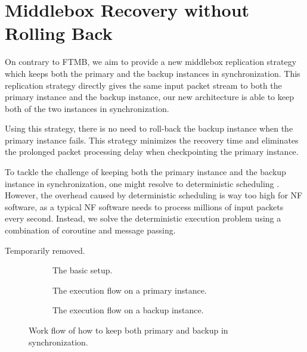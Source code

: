 \section{Middlebox Recovery without Rolling Back}

On contrary to FTMB, we aim to provide a new middlebox replication strategy
which keeps both the primary and the backup instances in synchronization. This
replication strategy directly gives the same input packet stream to both the
primary instance and the backup instance, our new architecture is able to keep
both of the two instances in synchronization.

Using this strategy, there is no need to roll-back the backup instance when the
primary instance fails. This strategy minimizes the recovery time and eliminates
the prolonged packet processing delay when checkpointing the primary instance.

To tackle the challenge of keeping both the primary instance and the backup
instance in synchronization, one might resolve to deterministic scheduling
\cite{}. However, the overhead caused by deterministic scheduling is way too
high for NF software, as a typical NF software needs to process millions of
input packets every second. Instead, we solve the deterministic execution
problem using a combination of coroutine and message passing.

\begin{verbbox} Temporarily removed. \end{verbbox}

\begin{figure}[!t]
  \begin{subfigure}[t]{0.5\linewidth}
    \centering
    \resizebox{0.95\columnwidth}{!}{\theverbbox}
    \caption{The basic setup.}\label{fig:overall}
  \end{subfigure}\hfill
  \begin{subfigure}[t]{0.5\linewidth}
    \centering
    \resizebox{0.95\columnwidth}{!}{\theverbbox}
    \caption{The execution flow on a primary instance.}\label{fig:primary}
  \end{subfigure}\hfill
  \begin{subfigure}[t]{0.5\linewidth}
    \centering
    \resizebox{0.95\columnwidth}{!}{\theverbbox}
    \caption{The execution flow on a backup instance.}\label{fig:backup}
  \end{subfigure}
\caption{Work flow of how to keep both primary and backup in synchronization.}
\label{fig:fig}
\end{figure}

